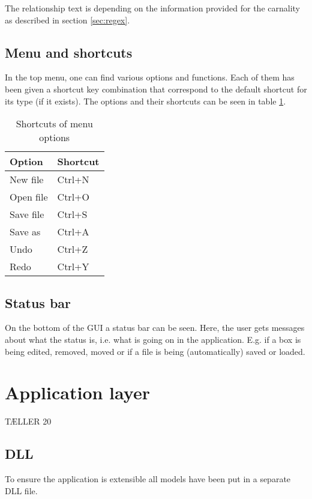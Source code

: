 The relationship text is depending on the information provided for the carnality as described in section \ref{sec:regex}.

\subsection{Menu and shortcuts}

In the top menu, one can find various options and functions. Each of them has been given a shortcut key combination that correspond to the default shortcut for its type (if it exists). The options and their shortcuts can be seen in table \ref{tab:menu_shortcut}.

\begin{table}[htbp]
\centering
\begin{tabular}{|l|l|}
\hline
\textbf{Option} & \textbf{Shortcut}\\
\hline
New file & Ctrl+N\\
\hline
Open file & Ctrl+O\\
\hline
Save file & Ctrl+S\\
\hline
Save as & Ctrl+A\\
\hline
Undo & Ctrl+Z\\
\hline
Redo & Ctrl+Y\\
\hline
\end{tabular}
\caption{Shortcuts of menu options}
\label{tab:menu_shortcut}
\end{table}

\subsection{Status bar}

On the bottom of the GUI a status bar can be seen. Here, the user gets messages about what the status is, i.e. what is going on in the application. E.g. if a box is being edited, removed, moved or if a file is being (automatically) saved or loaded.

\section{Application layer}
\label{sec:app_layer}

TÆLLER 20

\subsection{DLL}
To ensure the application is extensible all models have been put in a separate DLL file.


